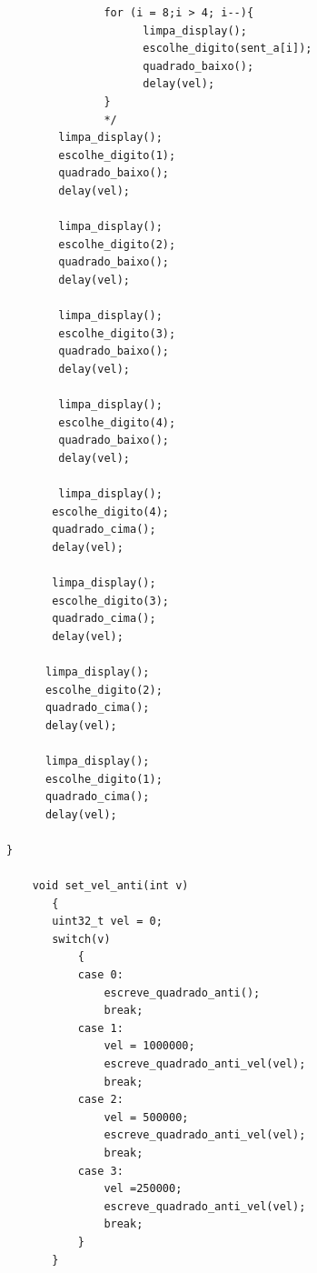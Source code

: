 \documentclass{article}
\begin{document}
\begin{lstlisting}
               for (i = 8;i > 4; i--){
                     limpa_display();
                     escolhe_digito(sent_a[i]);
                     quadrado_baixo();
                     delay(vel);
               }
               */
        limpa_display();
        escolhe_digito(1);
        quadrado_baixo();
        delay(vel);

        limpa_display();
        escolhe_digito(2);
        quadrado_baixo();
        delay(vel);

        limpa_display();
        escolhe_digito(3);
        quadrado_baixo();
        delay(vel);

        limpa_display();
        escolhe_digito(4);
        quadrado_baixo();
        delay(vel);

        limpa_display();
       escolhe_digito(4);
       quadrado_cima();
       delay(vel);

       limpa_display();
       escolhe_digito(3);
       quadrado_cima();
       delay(vel);

      limpa_display();
      escolhe_digito(2);
      quadrado_cima();
      delay(vel);

      limpa_display();
      escolhe_digito(1);
      quadrado_cima();
      delay(vel);

}

    void set_vel_anti(int v)
       {
       uint32_t vel = 0;
       switch(v)
           {
           case 0:
               escreve_quadrado_anti();
               break;
           case 1:
               vel = 1000000;
               escreve_quadrado_anti_vel(vel);
               break;
           case 2:
               vel = 500000;
               escreve_quadrado_anti_vel(vel);
               break;
           case 3:
               vel =250000;
               escreve_quadrado_anti_vel(vel);
               break;
           }
       }

\end{lstlisting}
\end{document}
